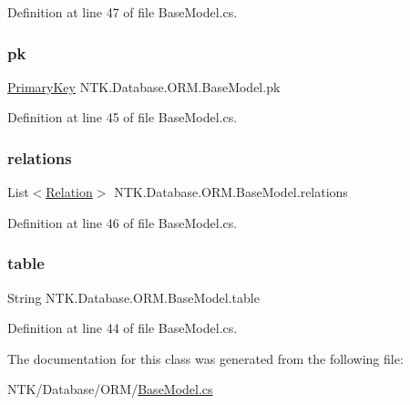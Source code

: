 Definition at line 47 of file Base\+Model.\+cs.

\mbox{\label{class_n_t_k_1_1_database_1_1_o_r_m_1_1_base_model_ae91649682c0969735cbd9b897160a97a}} 
\subsubsection{\texorpdfstring{pk}{pk}}
{\footnotesize\ttfamily \mbox{\hyperlink{class_n_t_k_1_1_database_1_1_o_r_m_1_1_primary_key}{Primary\+Key}} N\+T\+K.\+Database.\+O\+R\+M.\+Base\+Model.\+pk\hspace{0.3cm}{\ttfamily [protected]}}



Definition at line 45 of file Base\+Model.\+cs.

\mbox{\label{class_n_t_k_1_1_database_1_1_o_r_m_1_1_base_model_a9eb1dab4f5bee3bbea414ffc19e5fbbc}} 
\subsubsection{\texorpdfstring{relations}{relations}}
{\footnotesize\ttfamily List$<$\mbox{\hyperlink{class_n_t_k_1_1_database_1_1_o_r_m_1_1_relation}{Relation}}$>$ N\+T\+K.\+Database.\+O\+R\+M.\+Base\+Model.\+relations\hspace{0.3cm}{\ttfamily [protected]}}



Definition at line 46 of file Base\+Model.\+cs.

\mbox{\label{class_n_t_k_1_1_database_1_1_o_r_m_1_1_base_model_afcf18c824f83a0d998e3cd3fbbbf18ca}} 
\subsubsection{\texorpdfstring{table}{table}}
{\footnotesize\ttfamily String N\+T\+K.\+Database.\+O\+R\+M.\+Base\+Model.\+table\hspace{0.3cm}{\ttfamily [protected]}}



Definition at line 44 of file Base\+Model.\+cs.



The documentation for this class was generated from the following file\+:\begin{DoxyCompactItemize}
\item 
N\+T\+K/\+Database/\+O\+R\+M/\mbox{\hyperlink{_base_model_8cs}{Base\+Model.\+cs}}\end{DoxyCompactItemize}

